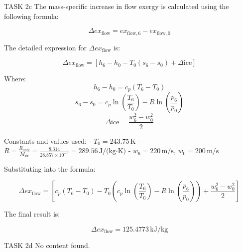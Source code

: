 TASK 2c  
The mass-specific increase in flow exergy is calculated using the following formula:  

\[
\Delta ex_{\text{flow}} = ex_{\text{flow},6} - ex_{\text{flow},0}
\]

The detailed expression for \( \Delta ex_{\text{flow}} \) is:  

\[
\Delta ex_{\text{flow}} = \left[ h_6 - h_0 - T_0 \left( s_6 - s_0 \right) + \Delta \text{ice} \right]
\]

Where:  
\[
h_6 - h_0 = c_p \left( T_6 - T_0 \right)
\]  
\[
s_6 - s_0 = c_p \ln \left( \frac{T_6}{T_0} \right) - R \ln \left( \frac{p_6}{p_0} \right)
\]  
\[
\Delta \text{ice} = \frac{w_6^2 - w_0^2}{2}
\]

Constants and values used:  
- \( T_0 = 243.75 \, \text{K} \)  
- \( R = \frac{R_{\text{univ}}}{M_{\text{air}}} = \frac{8.314}{28.857 \times 10^{-3}} = 289.56 \, \text{J/(kg·K)} \)  
- \( w_6 = 220 \, \text{m/s} \), \( w_0 = 200 \, \text{m/s} \)  

Substituting into the formula:  

\[
\Delta ex_{\text{flow}} = \left[ c_p \left( T_6 - T_0 \right) - T_0 \left( c_p \ln \left( \frac{T_6}{T_0} \right) - R \ln \left( \frac{p_6}{p_0} \right) \right) + \frac{w_6^2 - w_0^2}{2} \right]
\]

The final result is:  

\[
\Delta ex_{\text{flow}} = 125.4773 \, \text{kJ/kg}
\]

TASK 2d  
No content found.